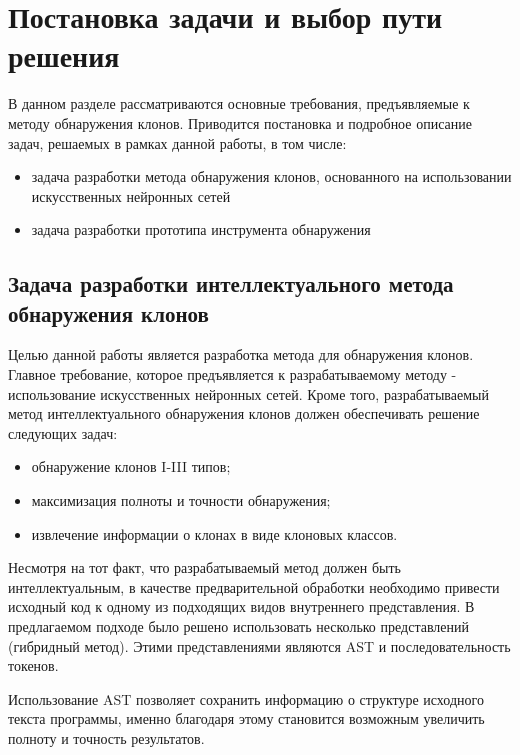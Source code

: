 \chapter{Постановка задачи и выбор пути решения}

В данном разделе рассматриваются основные требования, предъявляемые к методу обнаружения клонов. Приводится постановка и подробное описание задач, решаемых в рамках данной работы, в том числе:
\begin{itemize}
\setlength\itemsep{0mm}
\item задача разработки метода обнаружения клонов, основанного на использовании искусственных нейронных сетей
\item задача разработки прототипа инструмента обнаружения
\end{itemize}
\section{Задача разработки интеллектуального метода обнаружения клонов}

Целью данной работы является разработка метода для обнаружения клонов. Главное требование, которое предъявляется к разрабатываемому методу - использование искусственных нейронных сетей. Кроме того, разрабатываемый метод интеллектуального обнаружения клонов должен обеспечивать решение следующих задач:
\begin{itemize}
\setlength\itemsep{0mm}
\item обнаружение клонов I-III типов;
\item максимизация полноты и точности обнаружения;
\item извлечение информации о клонах в виде клоновых классов.
\end{itemize}

Несмотря на тот факт, что разрабатываемый метод должен быть интеллектуальным, в качестве предварительной обработки необходимо привести исходный код к одному из подходящих видов внутреннего представления. В предлагаемом подходе было решено использовать несколько представлений (гибридный метод). Этими представлениями являются AST и последовательность токенов. 

Использование AST позволяет сохранить информацию о структуре исходного текста программы, именно благодаря этому становится возможным увеличить полноту и точность результатов.

